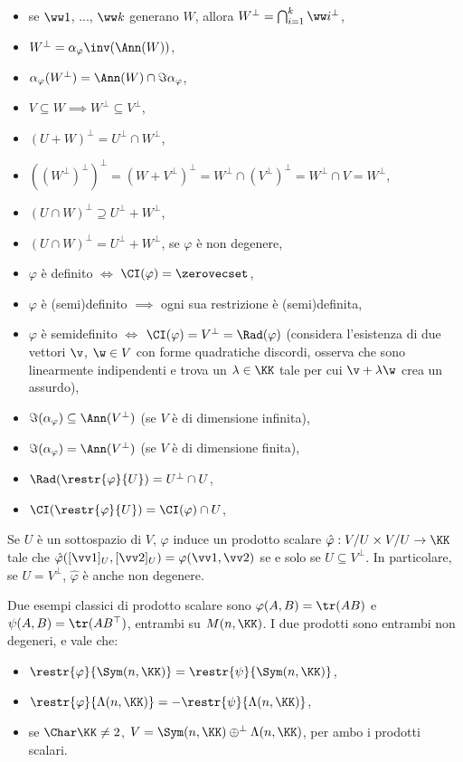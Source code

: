 \documentclass[10pt,landscape]{article}
\begin{document}
\begin{multicols}{3}
\begin{itemize}
			\item se $\ww 1$, ..., $\ww k$ generano $W$, allora $W^\perp = \bigcap_{i = 1}^k \ww i ^\perp$,
			\item $W^\perp = \alpha_\varphi\inv(\Ann(W))$,
			\item $\alpha_\varphi(W^\perp) = \Ann(W) \cap \Im \alpha_\varphi$,
			\item $V \subseteq W \implies W^\perp \subseteq V^\perp$,
			\item $(U + W)^\perp = U^\perp \cap W^\perp$,
			\item $((W^\perp)^\perp)^\perp = (W + V^\perp)^\perp = W^\perp \cap (V^\perp)^\perp = W^\perp \cap V = W^\perp$,
			\item $(U \cap W)^\perp \supseteq U^\perp + W^\perp$,
			\item $(U \cap W)^\perp = U^\perp + W^\perp$, se $\varphi$ è non degenere,
			\item $\varphi$ è definito $\iff$ $\CI(\varphi) = \zerovecset$,
			\item $\varphi$ è (semi)definito $\implies$ ogni sua restrizione è (semi)definita,
			\item $\varphi$ è semidefinito $\iff$ $\CI(\varphi) = V^\perp = \Rad(\varphi)$ (considera l'esistenza
			di due vettori $\v$, $\w \in V$ con forme quadratiche discordi, osserva che sono linearmente indipendenti
			e trova un $\lambda \in \KK$ tale per cui $\v + \lambda \w$ crea un assurdo),
			\item $\Im(\alpha_\varphi) \subseteq \Ann(V^\perp)$ (se $V$ è di dimensione infinita),
			\item $\Im(\alpha_\varphi) = \Ann(V^\perp)$ (se $V$ è di dimensione finita),
			\item $\Rad(\restr{\varphi}{U}) = U^\perp \cap U$,
			\item $\CI(\restr{\varphi}{U}) = \CI(\varphi) \cap U$,
		\end{itemize}
		
		Se $U$ è un sottospazio di $V$, $\varphi$ induce un prodotto scalare $\hat \varphi : V/U \times V/U \to \KK$ tale che $\hat \varphi([\vv 1]_U, [\vv 2]_U) = \varphi(\vv 1, \vv 2)$ se e solo se $U \subseteq V^\perp$. In particolare, se $U = V^\perp$,
		$\hat \varphi$ è anche non degenere.

		Due esempi classici di prodotto scalare sono $\varphi(A, B) = \tr(AB)$ e
		$\psi(A, B) = \tr(AB^\top)$, entrambi su $M(n, \KK)$. I due prodotti sono
		entrambi non degeneri, e vale che:
		
		\begin{itemize}
			\item $\restr{\varphi}{\Sym(n, \KK)} = \restr{\psi}{\Sym(n, \KK)}$,
			\item $\restr{\varphi}{\Lambda(n, \KK)} = -\restr{\psi}{\Lambda(n, \KK)}$,
			\item se $\Char \KK \neq 2$, $V = \Sym(n, \KK) \oplus^\perp \Lambda(n, \KK)$,
			per ambo i prodotti scalari.
		\end{itemize}
		

\end{multicols}
\end{document}
